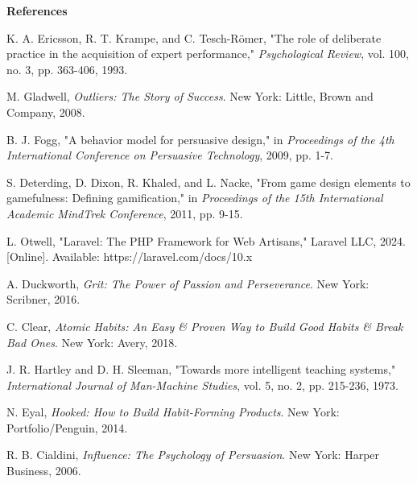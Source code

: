 \documentclass[12pt,a4paper]{report}
\newcommand{\JustifiedNormal}{\fontsize{12}{14}\selectfont\justifying\setlength{\parindent}{0pt}}
\begin{document}
\clearpage

\begin{center}
  {\fontsize{14}{17}\selectfont\bfseries References}
\end{center}
\vspace{2em}
\JustifiedNormal

\begin{enumerate}[label={[\arabic*]}, leftmargin=*]
  \item K. A. Ericsson, R. T. Krampe, and C. Tesch-Römer, "The role of deliberate practice in the acquisition of expert performance," \textit{Psychological Review}, vol. 100, no. 3, pp. 363-406, 1993.
  
  \item M. Gladwell, \textit{Outliers: The Story of Success}. New York: Little, Brown and Company, 2008.
  
  \item B. J. Fogg, "A behavior model for persuasive design," in \textit{Proceedings of the 4th International Conference on Persuasive Technology}, 2009, pp. 1-7.
  
  \item S. Deterding, D. Dixon, R. Khaled, and L. Nacke, "From game design elements to gamefulness: Defining gamification," in \textit{Proceedings of the 15th International Academic MindTrek Conference}, 2011, pp. 9-15.
  
  \item L. Otwell, "Laravel: The PHP Framework for Web Artisans," Laravel LLC, 2024. [Online]. Available: https://laravel.com/docs/10.x
  
  \item A. Duckworth, \textit{Grit: The Power of Passion and Perseverance}. New York: Scribner, 2016.
  
  \item C. Clear, \textit{Atomic Habits: An Easy \& Proven Way to Build Good Habits \& Break Bad Ones}. New York: Avery, 2018.
  
  \item J. R. Hartley and D. H. Sleeman, "Towards more intelligent teaching systems," \textit{International Journal of Man-Machine Studies}, vol. 5, no. 2, pp. 215-236, 1973.
  
  \item N. Eyal, \textit{Hooked: How to Build Habit-Forming Products}. New York: Portfolio/Penguin, 2014.
  
  \item R. B. Cialdini, \textit{Influence: The Psychology of Persuasion}. New York: Harper Business, 2006.
  

\end{enumerate}
\end{document}
